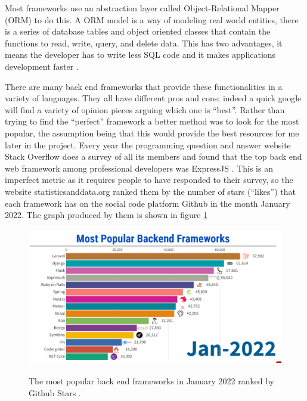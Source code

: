 \documentclass{UoYCSproject}
\begin{document}
Most frameworks use an abstraction layer called Object-Relational Mapper (ORM) to do this. A ORM model is a way of modeling real world entities, there is a series of database tables and object oriented classes that contain the functions to read, write, query, and delete data. This has two advantages, it means the developer has to write less SQL code and it makes applications development faster \cite{techopedia_orm_definition}.

There are many back end frameworks that provide these functionalities in a variety of languages. They all have different pros and cons; indeed a quick google will find a variety of opinion pieces arguing which one is “best”. Rather than trying to find the “perfect” framework a better method was to look for the most popular, the assumption being that this would provide the best resources for me later in the project. Every year the programming question and answer website Stack Overflow does a survey of all its members and found that the top back end web framework among professional developers was ExpressJS \cite{stackoverflow_dev_survey_2021}. This is an imperfect metric as it requires people to have responded to their survey, so the website statisticsanddata.org ranked them by the number of stars (“likes”) that each framework has on the social code platform Github \cite{statisticsanddata_backend_frameworks_2021} in the month January 2022. The graph produced by them is shown in figure \ref{fig:statisticsanddata}

\begin{figure}[htb]
\begin{center}
\includegraphics[height=6cm]{"./assets/lit-review-assets/statisticsanddata_backend_frameworks_2021_2022"}
\label{fig:statisticsanddata}
\end{center}
\caption{The most popular back end frameworks in January 2022 ranked by Github Stars \protect\cite{statisticsanddata_backend_frameworks_2021}.}
\end{figure}
\end{document}
